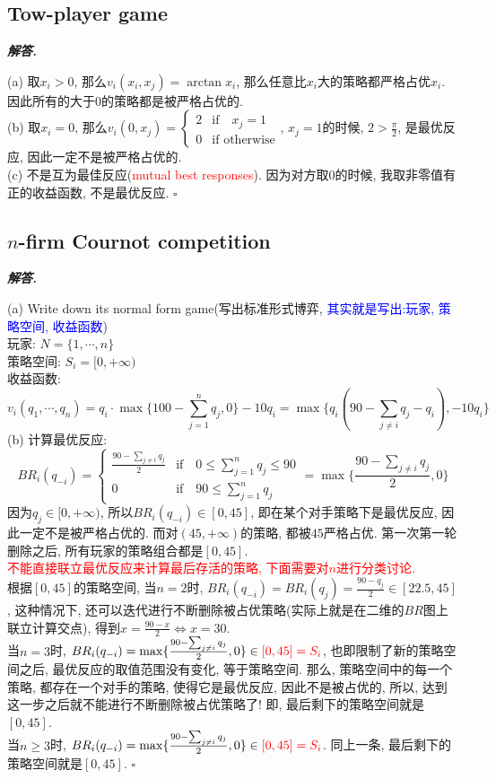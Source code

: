 \documentclass[10pt, a4paper, oneside]{ctexart}
\newenvironment{solution}{%
  \par\noindent\textbf{\textit{解答. }}\ignorespaces
}{%
  \hfill\ensuremath{\square}\par %
}
\begin{document}
\subsection{Tow-player game}
\begin{solution}
(a) 取$x_i>0$, 那么$v_i(x_i,x_j)=\arctan x_i$, 那么任意比$x_i$大的策略都严格占优$x_i$. 因此所有的大于$0$的策略都是被严格占优的.\\
(b) 取$x_i=0$, 那么$v_i(0,x_j)=\begin{cases}
    2& \text{if} \quad x_j=1\\
    0 & \text{if otherwise}
\end{cases}$, $x_j=1$的时候, $2>\frac{\pi}{2}$, 是最优反应, 因此一定不是被严格占优的.\\
(c) 不是互为最佳反应(\textcolor{red}{mutual best responses}). 因为对方取$0$的时候, 我取非零值有正的收益函数, 不是最优反应.
\end{solution}

\subsection{\texorpdfstring{$n$-firm Cournot competition}{n-firm Cournot competition}}


\begin{solution}
(a) Write down its normal form game(写出标准形式博弈, \textcolor{blue}{其实就是写出:玩家, 策略空间, 收益函数})\\
玩家: $N=\{1,\cdots,n\}$\\
策略空间: $S_i=[0,+\infty)$\\
收益函数: 
$$v_i(q_1,\cdots,q_n)=q_i\cdot\max\{100-\sum_{j=1}^nq_j,0\}-10q_i=\max\{q_i(90-\sum_{j\neq i}q_j -q_i), -10q_i\}$$
(b) 计算最优反应: 
$$BR_i(q_{-i})=\begin{cases}
    \frac{90-\sum_{j\neq i}q_j}{2}&\text{if} \quad 0\leq \sum_{j=1}^n q_j \leq 90\\
    0&\text{if} \quad  90\leq \sum_{j=1}^n q_j 
\end{cases}=\max\{\frac{90-\sum_{j\neq i}q_j}{2},0\}$$
因为$q_j\in [0,+\infty)$, 所以$BR_i(q_{-i})\in [0,45]$, 即在某个对手策略下是最优反应, 因此一定不是被严格占优的. 而对$(45,+\infty)$的策略, 都被$45$严格占优. 第一次第一轮删除之后, 所有玩家的策略组合都是$[0,45]$.\\
\textcolor{red}{不能直接联立最优反应来计算最后存活的策略, 下面需要对$n$进行分类讨论.}\\
根据$[0,45]$的策略空间, 当$n=2$时, $BR_i(q_{-i})=BR_i(q_j)=\frac{90-q_j}{2}\in [22.5,45]$, 这种情况下, 还可以迭代进行不断删除被占优策略(实际上就是在二维的$BR$图上联立计算交点), 得到$x=\frac{90-x}{2}\iff x=30$.\\
当$n=3$时, $BR_i(q_{-i})=\max\{\frac{90-\sum_{j\neq i}q_j}{2},0\}\in \textcolor{red}{[0,45]=S_{i}}$, 也即限制了新的策略空间之后, 最优反应的取值范围没有变化, 等于策略空间. 那么, 策略空间中的每一个策略, 都存在一个对手的策略, 使得它是最优反应, 因此不是被占优的, 所以, 达到这一步之后就不能进行不断删除被占优策略了! 即, 最后剩下的策略空间就是$[0,45]$.\\
当$n\geq 3$时, $BR_i(q_{-i})=\max\{\frac{90-\sum_{j\neq i}q_j}{2},0\}\in \textcolor{red}{[0,45]=S_{i}}$. 同上一条, 最后剩下的策略空间就是$[0,45]$.
\end{solution}
\end{document}
